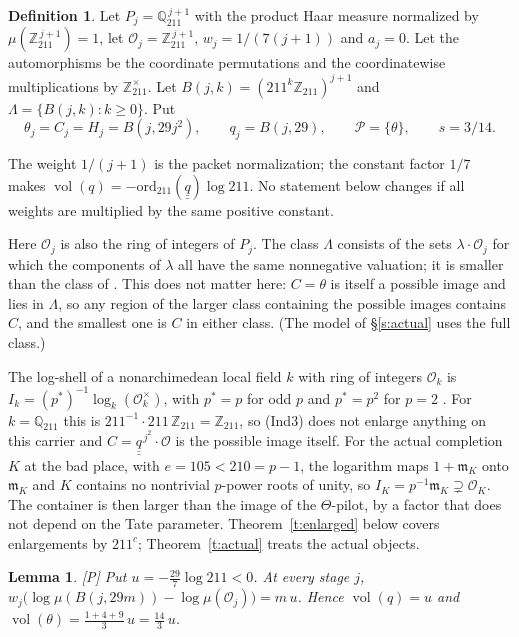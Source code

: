 \documentclass[11pt]{article}
\theoremstyle{plain}
\newtheorem{lemma}[theorem]{Lemma}
\theoremstyle{definition}
\newtheorem{definition}[theorem]{Definition}
\theoremstyle{remark}
\newcommand{\Pmark}{\textup{[P]}}
\newcommand{\vol}{\operatorname{vol}}
\newcommand{\Poss}{\mathcal P}
\newcommand{\cO}{\mathcal O}
\newcommand{\Qp}[1]{\mathbb Q_{#1}}
\newcommand{\qbb}{\underline{\underline q}}
\begin{document}
\begin{definition}\label{d:model}
Let $P_j=\Qp{211}^{\,j+1}$ with the product Haar measure normalized by
$\mu(\mathbb Z_{211}^{\,j+1})=1$, let $\cO_j=\mathbb Z_{211}^{\,j+1}$, $w_j=1/(7(j+1))$
and $a_j=0$. Let the automorphisms be the coordinate permutations and the coordinatewise
multiplications by $\mathbb Z_{211}^\times$. Let $B(j,k)=(211^k\mathbb Z_{211})^{j+1}$
and $\Lambda=\{B(j,k):k\ge0\}$. Put
\[
\theta_j=C_j=H_j=B(j,29j^2),\qquad q_j=B(j,29),\qquad \Poss=\{\theta\},\qquad s=3/14.
\]
\end{definition}

The weight $1/(j+1)$ is the packet normalization; the constant factor $1/7$ makes
$\vol(q)=-\mathrm{ord}_{211}(\qbb)\log211$. No statement below changes if all weights are
multiplied by the same positive constant.

Here $\cO_j$ is also the ring of integers of $P_j$. The class $\Lambda$ consists of the
sets $\lambda\cdot\cO_j$ for which the components of $\lambda$ all have the same
nonnegative valuation; it is smaller than the class of
\cite[Rem.~3.9.5(i)]{IUT3}. This does not matter here: $C=\theta$ is itself a possible
image and lies in $\Lambda$, so any region of the larger class containing the possible
images contains $C$, and the smallest one is $C$ in either class. (The model of
\S\ref{s:actual} uses the full class.)

The log-shell of a nonarchimedean local field $k$ with ring of integers $\cO_k$ is
$I_k=(p^*)^{-1}\log_k(\cO_k^\times)$,
with $p^*=p$ for odd $p$ and $p^*=p^2$ for $p=2$ \cite[Rem.~1.2.2(i)]{IUT3}. For $k=\Qp{211}$ this is
$211^{-1}\cdot211\,\mathbb Z_{211}=\mathbb Z_{211}$, so (Ind3) does not enlarge anything
on this carrier and $C=\qbb^{\,j^2}\cdot\cO$ is the possible image itself. For the actual
completion $K$ at the bad place, with $e=105<210=p-1$, the logarithm maps $1+\mathfrak m_K$
onto $\mathfrak m_K$ and $K$ contains no nontrivial $p$-power roots of unity, so
$I_K=p^{-1}\mathfrak m_K\supsetneq\cO_K$. The container is then larger than the image of the
$\Theta$-pilot, by a factor that does not depend on the Tate parameter.
Theorem~\ref{t:enlarged} below
covers enlargements by $211^{c}$; Theorem~\ref{t:actual} treats the actual objects.

\begin{lemma}\label{l:vols}
\Pmark{} Put $u=-\frac{29}{7}\log211<0$. At every stage $j$,
$w_j\bigl(\log\mu(B(j,29m))-\log\mu(\cO_j)\bigr)=m\,u$. Hence $\vol(q)=u$ and
$\vol(\theta)=\frac{1+4+9}{3}\,u=\frac{14}{3}\,u$.
\end{lemma}
\end{document}
